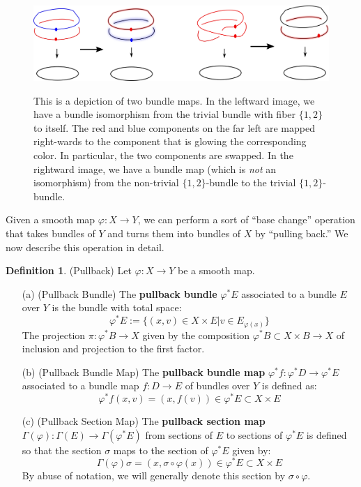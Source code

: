 \documentclass[12pt]{article}
\theoremstyle{definition}
\newtheorem{definition}[theorem]{Definition}
\numberwithin{equation}{section}
\begin{document}
\begin{figure}[h!]
    \centering
    \includegraphics[width=1\textwidth]{reu_figures/maps_of_bundles_1.png}
    \label{fig:maps_of_bundles_1}
    \caption{This is a depiction of two bundle maps. In the leftward image, we have a bundle isomorphism from the trivial bundle with fiber $\{1,2\}$ to itself. The red and blue components on the far left are mapped right-wards to the component that is glowing the corresponding color. In particular, the two components are swapped. In the rightward image, we have a bundle map (which is \emph{not} an isomorphism) from the non-trivial $\{1,2\}$-bundle to the trivial $\{1,2\}$-bundle.}
\end{figure}

Given a smooth map $\varphi:X \to Y$, we can perform a sort of ``base change'' operation that takes bundles of $Y$ and turns them into bundles of $X$ by ``pulling back.'' We now describe this operation in detail.

\begin{definition} \label{def:pullback} (Pullback) Let $\varphi:X \to Y$ be a smooth map. 
\begin{itemize} 

	\item[(a)] (Pullback Bundle) The {\bf pullback bundle} $\varphi^*E$ associated to a bundle $E$ over $Y$ is the bundle with total space:
	\[
	\varphi^*E := \{(x,v) \in X \times E| v \in E_{\varphi(x)}\}
	\]
	The projection $\pi:\varphi^*B \to X$ given by the composition $\varphi^*B \subset X \times B \to X$ of inclusion and projection to the first factor.
	\item[(b)] (Pullback Bundle Map) The {\bf pullback bundle map} $\varphi^*f:\varphi^*D \to \varphi^*E$ associated to a bundle map $f:D \to E$ of bundles over $Y$ is defined as:
	\[
	\varphi^*f(x,v) = (x,f(v)) \in \varphi^*E \subset X \times E
	\]
	\item[(c)] (Pullback Section Map) The {\bf pullback section map} $\Gamma(\varphi):\Gamma(E) \to \Gamma(\varphi^*E)$ from sections of $E$ to sections of $\varphi^*E$ is defined so that the section $\sigma$ maps to the section of $\varphi^*E$ given by:
	\[
	\Gamma(\varphi)\sigma = (x,\sigma \circ \varphi(x)) \in \varphi^*E \subset X \times E
	\]
	By abuse of notation, we will generally denote this section by $\sigma \circ \varphi$. 
\end{itemize}
\end{definition}
\end{document}
